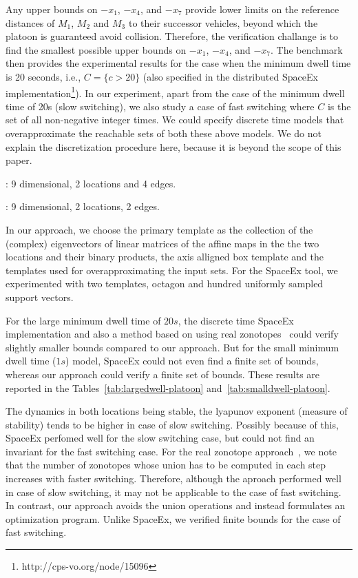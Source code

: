 %
 Any upper bounds on $-x_1$, $-x_4$, and $-x_7$ provide lower limits
 on the reference distances of $M_1$, $M_2$ and $M_3$ to their
 successor vehicles, beyond which the platoon is guaranteed avoid
 collision.  Therefore, the verification challange is to find the
 smallest possible upper bounds on $-x_1$, $-x_4$, and $-x_7$.  The
 benchmark then provides the experimental results for the case when
 the minimum dwell time is 20 seconds, i.e., $C=\{c>20\}$ (also
 specified in the distributed SpaceEx
 implementation\footnote{http://cps-vo.org/node/15096}).  In our
 experiment, apart from the case of the minimum dwell time of 20s
 (slow switching), we also study a case of fast switching where $C$ is
 the set of all non-negative integer times.  We could specify discrete time
 models that overapproximate the reachable sets of both these above
 models.  We do not explain the discretization procedure here, because
 it is beyond the scope of this paper.

: 9 dimensional, 2
locations and 4 edges.

: 9 dimensional, 2
locations, 2 edges.

  In our approach, we choose the primary template
as the collection of the (complex) eigenvectors of linear matrices of
the affine maps in the the two locations and their binary products,
the axis alligned box template and the templates used for
overapproximating the input sets. For the SpaceEx tool, we
experimented with two templates, octagon and hundred uniformly sampled
support vectors.

  For the large minimum dwell time of $20s$, the
discrete time SpaceEx implementation and also a method based on using
real zonotopes~\cite{makhlouf2014networked} could verify slightly
smaller bounds compared to our approach.
But for the small minimum dwell time ($1s$) model, SpaceEx could not
even find a finite set of bounds, whereas our approach could verify a
finite set of bounds.  These results are reported in the
Tables~\ref{tab:largedwell-platoon} and~\ref{tab:smalldwell-platoon}.

  The dynamics in both locations being stable, the
lyapunov exponent (measure of stability) tends to be higher in case of
slow switching.  Possibly because of this, SpaceEx perfomed well for
the slow switching case, but could not find an invariant for the fast
switching case.  For the real zonotope
approach~\cite{makhlouf2014networked}, we note that the number of
zonotopes whose union has to be computed in each step increases  with
faster switching.  Therefore, although the aproach performed well in
case of slow switching, it may not be applicable to the case of fast
switching.  In contrast, our approach
avoids the union operations and instead formulates an optimization
program.  Unlike SpaceEx, we verified finite bounds for the case of
fast switching.


